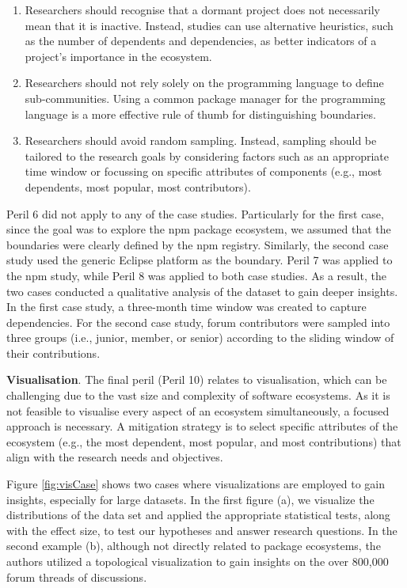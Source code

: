 \begin{enumerate}
    \item Researchers should recognise that a dormant project does not necessarily mean that it is inactive. Instead, studies can use alternative heuristics, such as the number of dependents and dependencies, as better indicators of a project's importance in the ecosystem.
    \item Researchers should not rely solely on the programming language to define sub-communities. Using a common package manager for the programming language is a more effective rule of thumb for distinguishing boundaries.
    \item Researchers should avoid random sampling. Instead, sampling should be tailored to the research goals by considering factors such as an appropriate time window or focussing on specific attributes of components (e.g., most dependents, most popular, most contributors).
\end{enumerate}


Peril 6 did not apply to any of the case studies. 
Particularly for the first case, since the goal was to explore the npm package ecosystem, we assumed that the boundaries were clearly defined by the npm registry. 
Similarly, the second case study used the generic Eclipse platform as the boundary. 
Peril 7 was applied to the npm study, while Peril 8 was applied to both case studies. 
As a result, the two cases conducted a qualitative analysis of the dataset to gain deeper insights.
In the first case study, a three-month time window was created to capture dependencies. 
For the second case study, forum contributors were sampled into three groups (i.e., junior, member, or senior) according to the sliding window of their contributions. 

\smallskip\noindent\textbf{Visualisation}.
The final peril (Peril 10) relates to visualisation, which can be challenging due to the vast size and complexity of software ecosystems. As it is not feasible to visualise every aspect of an ecosystem simultaneously, a focused approach is necessary. A mitigation strategy is to select specific attributes of the ecosystem (e.g., the most dependent, most popular, and most contributions) that align with the research needs and objectives. 

Figure \ref{fig:visCase} shows two cases where visualizations are employed to gain insights, especially for large datasets.
In the first figure (a), we visualize the distributions of the data set and applied the appropriate statistical tests, along with the effect size, to test our hypotheses and answer research questions. 
In the second example (b), although not directly related to package ecosystems, the authors utilized a topological visualization \cite{Lum2013ExtractingIF} to gain insights on the over 800,000 forum threads of discussions. 



